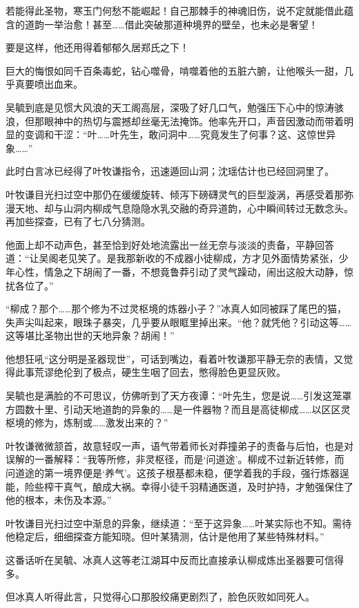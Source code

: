 若能得此圣物，寒玉门何愁不能崛起！自己那棘手的神魂旧伤，说不定就能借此蕴含的道韵一举治愈！甚至……借此突破那道种境界的壁垒，也未必是奢望！

要是这样，他还用得着郁郁久居郑氏之下！

巨大的悔恨如同千百条毒蛇，钻心噬骨，啃噬着他的五脏六腑，让他喉头一甜，几乎真要喷出血来。

\vspace{2em}

吴毓到底是见惯大风浪的天工阁高层，深吸了好几口气，勉强压下心中的惊涛骇浪，但那眼神中的热切与震撼却丝毫无法掩饰。他率先开口，声音因激动而带着明显的变调和干涩：“叶……叶先生，敢问洞中……究竟发生了何事？这、这惊世异象……”

此时白言冰已经得了叶牧谦指令，迅速遁回山洞；沈瑶估计也已经回洞里了。

叶牧谦目光扫过空中那仍在缓缓旋转、倾泻下磅礴灵气的巨型漩涡，再感受着那弥漫天地、却与山洞内柳成气息隐隐水乳交融的奇异道韵，心中瞬间转过无数念头。再加些探查，已有了七八分猜测。

他面上却不动声色，甚至恰到好处地流露出一丝无奈与淡淡的责备，平静回答道：“让吴阁老见笑了。是我那新收的不成器小徒柳成，方才见外面情势紧张，少年心性，情急之下胡闹了一番，不想竟鲁莽引动了灵气躁动，闹出这般大动静，惊扰各位了。”

“柳成？那个……那个修为不过灵枢境的炼器小子？”冰真人如同被踩了尾巴的猫，失声尖叫起来，眼珠子暴突，几乎要从眼眶里掉出来。“他？就凭他？引动这等……这等堪比圣物出世的天地异象？胡闹！”

他想狂吼“这分明是圣器现世”，可话到嘴边，看着叶牧谦那平静无奈的表情，又觉得此事荒谬绝伦到了极点，硬生生咽了回去，憋得脸色更显灰败。

吴毓也是满脸的不可思议，仿佛听到了天方夜谭：“叶先生，您是说……引发这笼罩方圆数十里、引动天地道韵的异象的……是一件器物？而且是高徒柳成……以区区灵枢境的修为，炼制或……激发出来的？”

叶牧谦微微颔首，故意轻叹一声，语气带着师长对莽撞弟子的责备与后怕，也是对误解的一番解释：“我等所修，非灵枢径，而是‘问道途’。柳成不过新近转修，而问道途的第一境界便是‘养气’。这孩子根基都未稳，便学着我的手段，强行炼器逞能，险些榨干真气，酿成大祸。幸得小徒千羽精通医道，及时护持，才勉强保住了他的根本，未伤及本源。”

叶牧谦目光扫过空中渐息的异象，继续道：“至于这异象……叶某实际也不知。需待他稳定后，细细探查方能知晓。但叶某猜测，估计是他用了某些特殊材料。”

这番话听在吴毓、冰真人这等老江湖耳中反而比直接承认柳成炼出圣器要可信得多。

但冰真人听得此言，只觉得心口那股绞痛更剧烈了，脸色灰败如同死人。

